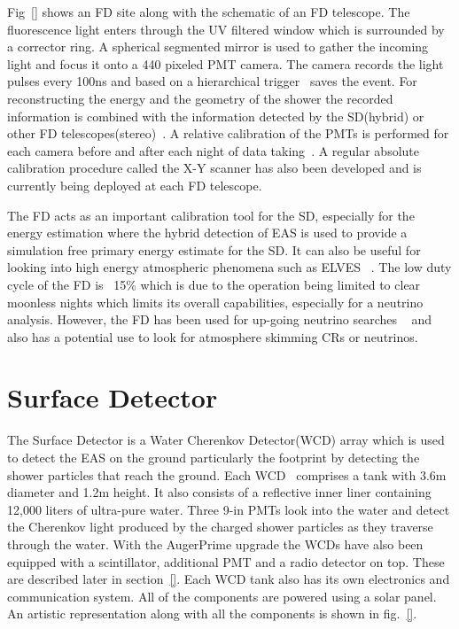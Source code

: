 Fig~\ref{} shows an FD site along with the schematic of an FD telescope. The fluorescence light enters through the UV filtered window 
which is surrounded by a corrector ring. A spherical segmented mirror is used to gather the incoming light and focus it onto a 440 pixeled PMT camera. The camera records the light pulses every 100ns and based on a hierarchical trigger~\cite{} saves the event. For reconstructing the energy and the geometry of the shower the recorded information is combined with the information detected by the SD(hybrid) or other FD telescopes(stereo)~\cite{}. A relative calibration of the PMTs is performed for each camera before and after each night of data taking~\cite{}. A regular absolute calibration procedure called the X-Y scanner has also been developed and is currently being deployed at each FD telescope. 

The FD acts as an important calibration tool for the SD, especially for the energy estimation where the hybrid detection of EAS is used to provide a simulation free primary energy estimate for the SD. It can also be useful for looking into high energy atmospheric phenomena such as ELVES ~\cite{}. The low duty cycle of the FD is ~15\% which is due to the operation being limited to clear moonless nights which limits its overall capabilities, especially for a neutrino analysis. However, the FD has been used for up-going neutrino searches ~\cite{} and also has a potential use to look for atmosphere skimming CRs or neutrinos.  

\section{Surface Detector}
\label{sec:Sur_det}
The Surface Detector is a Water Cherenkov Detector(WCD) array which is used to detect the EAS on the ground particularly the footprint by detecting the shower particles that reach the ground. Each WCD~\cite{} comprises a tank with 3.6m diameter and 1.2m height. It also consists of a reflective inner liner containing 12,000 liters of ultra-pure water. Three 9-in PMTs look into the water and detect the Cherenkov light produced by the charged shower particles as they traverse through the water. With the AugerPrime upgrade the WCDs have also been equipped with a scintillator, additional PMT and a radio detector on top. These are described later in section~\ref{}. Each WCD tank also has its own electronics and communication system. All of the components are powered using a solar panel. An artistic representation along with all the components is shown in fig.~\ref{}. 

